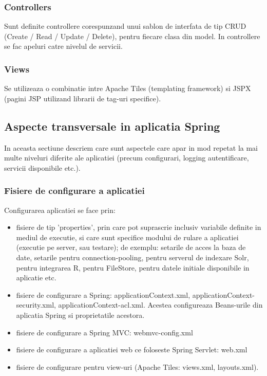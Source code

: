 \subsubsection{Controllers}
Sunt definite controllere corespunzand unui sablon de interfata de tip CRUD
(Create / Read / Update / Delete), pentru fiecare clasa din model. In
controllere se fac apeluri catre nivelul de servicii.

\subsubsection{Views}
Se utilizeaza o combinatie intre Apache Tiles (templating framework) si JSPX
(pagini JSP utilizand librarii de tag-uri specifice).

\subsection{Aspecte transversale in aplicatia Spring}
In aceasta sectiune descriem care sunt aspectele care apar in mod repetat la mai
multe niveluri diferite ale aplicatiei (precum configurari, logging
autentificare, servicii disponibile etc.).

\subsubsection{Fisiere de configurare a aplicatiei}
\label{fisiere_configurare}


Configurarea aplicatiei se face prin:
\begin {itemize}
  \item fisiere de tip 'properties', prin care pot suprascrie
inclusiv variabile definite in mediul de executie, si care sunt specifice modului de rulare a
aplicatiei (executie pe server, sau testare); de exemplu: setarile de acces la
baza de date, setarile pentru connection-pooling, pentru serverul de indexare
Solr, pentru integrarea R, pentru FileStore, pentru datele initiale disponibile
in aplicatie etc.
  \item fisiere de configurare a Spring: applicationContext.xml,
  applicationContext-security.xml, applicationContext-acl.xml. Acestea
  configureaza Beans-urile din aplicatia Spring si proprietatile acestora.
  \item fisiere de configurare a Spring MVC: webmvc-config.xml
  \item fisiere de configurare a aplicatiei web ce foloseste Spring Servlet:
  web.xml
  \item fisiere de configurare pentru view-uri (Apache Tiles: views.xml,
  layouts.xml).
\end{itemize}

